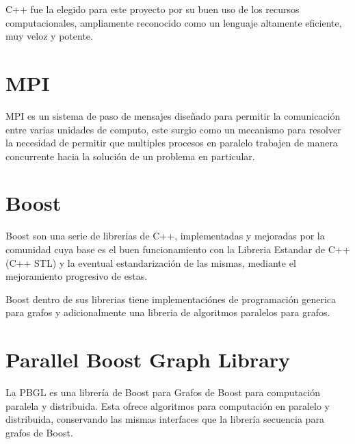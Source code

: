 	C++ fue la elegido para este proyecto por su buen uso de los recursos computacionales, ampliamente reconocido como un lenguaje altamente eficiente, muy veloz y potente. \cite{stroustrup2013c++}


	\section{MPI}

	MPI es un sistema de paso de mensajes diseñado para permitir la comunicación entre varias unidades de computo, este surgio como un mecanismo para resolver la necesidad de permitir que multiples procesos en paralelo trabajen de manera concurrente hacia la solución de un problema en particular.   \cite{Karniadakis}

	\section{Boost}

	Boost son una serie de librerias de C++, implementadas y mejoradas por la comunidad cuya base es el buen funcionamiento con la Libreria Estandar de C++ (C++ STL) y la eventual estandarización de las mismas, mediante el mejoramiento progresivo de estas.\cite{wwwBoost}

	Boost dentro de sus librerias tiene implementaciónes de programación generica para grafos y adicionalmente una libreria de algoritmos paralelos para grafos. 


	\section{Parallel Boost Graph Library}

	La PBGL es una librería de Boost para Grafos de Boost para computación paralela y distribuida. Esta ofrece algoritmos para computación en paralelo y distribuida, conservando las mismas interfaces que la librería secuencia para grafos de Boost.\cite{wwwBoost} 
